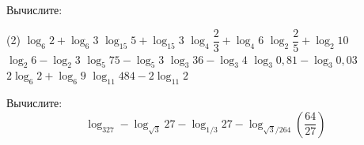 \begin{class}[number=1]
\begin{listofex}[resume]
		\item Вычислите:
		\begin{tasks}(2)
			\task \( \log_6 2 + \log_6 3 \)
			\task \( \log_{15} 5 + \log_{15} 3 \)
			\task \( \log_4 \dfrac{2}{3} + \log_4 6 \)
			\task \( \log_2 \dfrac{2}{5} + \log_2 10 \)
			\task \( \log_2 6 - \log_2 3 \)
			\task \( \log_5 75 - \log_5 3 \)
			\task \( \log_3 36 - \log_3 4 \)
			\task \( \log_3 0,81 - \log_3 0,03 \)
			\task \( 2\log_6 2 + \log_6 9 \)
			\task \( \log_{11} 484 - 2 \log_{11} 2 \)
		\end{tasks}
		\item Вычислите: 
		\[ \log_327-\log_{\sqrt{3}}27-\log_{1/3}27-\log_{\sqrt{3}/264}\left( \dfrac{64}{27} \right)  \]
	\end{listofex}
\end{class}

